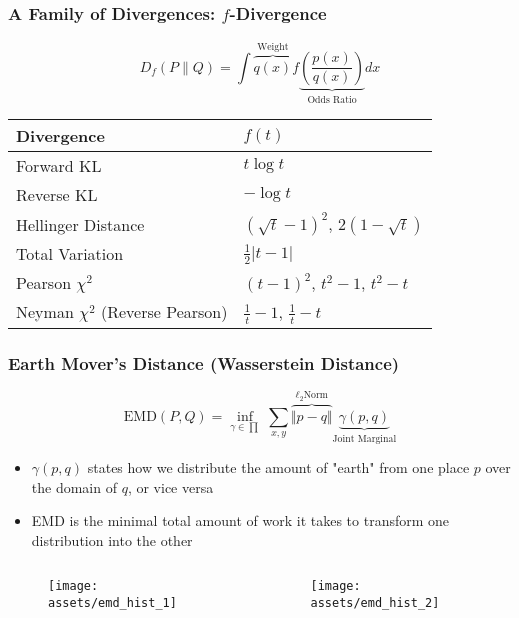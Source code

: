 \documentclass{beamer}
\begin{document}
\begin{frame}
  \frametitle{A Family of Divergences: $f$-Divergence}
  \begin{equation*}
    D_{f}(P \parallel Q) = \int \overbrace{q(x)}^{\text{Weight}} f \underbrace{\left( \frac{p(x)}{q(x)} \right)}_{\text{Odds Ratio}} dx
  \end{equation*}
  \begin{center}
  \begin{tabular}{C{5cm}|C{5cm}}
  \toprule
  {Divergence} & $f(t)$ \\
  \midrule
  Forward KL   &  $t \log t$ \\
  Reverse KL   &  $- \log t$ \\
  Hellinger Distance  &  $\left(\sqrt{t} - 1 \right)^2$, $2 \left( 1 - \sqrt{t} \right)$ \\
  Total Variation & $\frac{1}{2} \vert t - 1 \vert$ \\
  Pearson $\chi^2$ & $\left( t-1 \right)^2$, $t^2 - 1$, $t^2 - t$ \\
  Neyman $\chi^2$ (Reverse Pearson) & $\frac{1}{t} - 1$, $\frac{1}{t} - t$ \\
  \bottomrule
  \end{tabular}
  \end{center}
\end{frame}


\begin{frame}
  \frametitle{Earth Mover's Distance (Wasserstein Distance)}
  \begin{equation*}
    \text{EMD}\left(P, Q\right) = \inf_{\gamma \in \prod}  \, \sum\limits_{x,y} \overbrace{\Vert p - q \Vert}^{\ell_2 \text{Norm}} \underbrace{\gamma \left( p, q \right)}_{\text{Joint Marginal}}
  \end{equation*}
  \begin{itemize}
    \item $\gamma \left( p, q \right)$ states how we distribute the amount of "earth" from one place $p$ over the domain of $q$, or vice versa
    \item EMD is the minimal total amount of work it takes to transform one distribution into the other
  \end{itemize}
  \begin{columns}
    \begin{column}{0.48\textwidth}
      \begin{figure}
        \centering
        \texttt{[image: assets/emd\_hist\_1]}
      \end{figure}
    \end{column}
    \begin{column}{0.48\textwidth}
      \begin{figure}
        \centering
        \texttt{[image: assets/emd\_hist\_2]}
      \end{figure}
    \end{column}
  \end{columns}
\end{frame}
\end{document}
